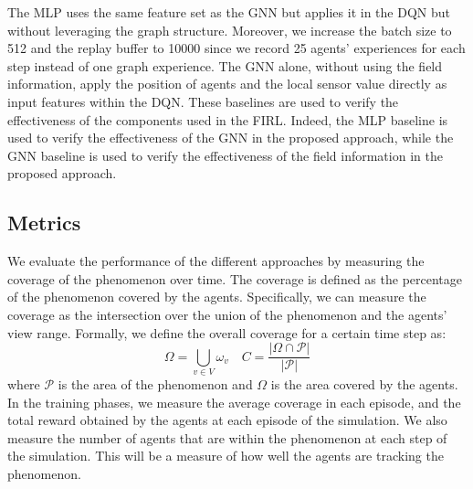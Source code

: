 The \ac{MLP} uses the same feature set as the \ac{GNN} but applies it in the \ac{DQN} but 
without leveraging the graph structure. Moreover, we increase the batch size to 512 and the replay buffer to 10000 since we record 25 agents' experiences for each step instead of one graph experience.
%
The \ac{GNN} alone, without using the field information, apply the position of agents and the local sensor value directly as input features within the \ac{DQN}.
%
These baselines are used to verify the effectiveness of the components used in the FIRL. 
%
Indeed, the \ac{MLP} baseline is used to verify the effectiveness of the \ac{GNN} in the proposed approach, while the \ac{GNN} baseline is used to verify the effectiveness of the field information in the proposed approach.
\subsection{Metrics}
We evaluate the performance of the different approaches by measuring the coverage of the phenomenon over time.
%
The coverage is defined as the percentage of the phenomenon covered by the agents.
%
Specifically, we can measure the coverage as the intersection over the union of the phenomenon and the agents' view range.
%
Formally, we define the overall coverage for a certain time step as:
\begin{equation*}
\Omega = \bigcup_{v \in V} \omega_v
\quad 
C = \frac{|\Omega \cap \mathcal{P}|}{|\mathcal{P}|}
\end{equation*}
where $\mathcal{P}$ is the area of the phenomenon and $\Omega$ is the area covered by the agents.
In the training phases, 
 we measure the average coverage in each episode, and the total reward obtained by the agents at each episode of the simulation. 
%
We also measure the number of agents that are within the phenomenon at each step of the simulation.
This will be a measure of how well the agents are tracking the phenomenon.

